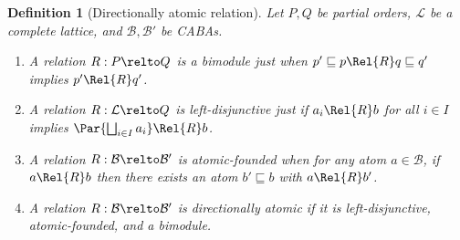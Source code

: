 \documentclass[10pt,a4paper]{article}
\newtheorem{definition}[theorem]{Definition}
\begin{document}
\begin{definition}[Directionally atomic relation]
  Let $P, Q$ be partial orders, $\mathcal{L}$ be a complete lattice, and
  $\mathcal{B}, \mathcal{B}'$ be CABAs.
  \begin{enumerate}
    \item A relation \(R : P \relto Q\) is a \emph{bimodule} just when \(p'
      \sqsubseteq p \Rel{R} q \sqsubseteq q'\) implies \(p' \Rel{R} q'\).
    \item A relation \(R : \mathcal{L} \relto Q\) is \emph{left-disjunctive}
      just if \(a_i \Rel{R} b\) for all $i \in I$ implies \(\Par{\bigsqcup_{i
      \in I} a_i} \Rel{R} b\).
    \item A relation \(R : \mathcal{B} \relto \mathcal{B}'\) is
      \emph{atomic-founded} when for any atom \(a \in \mathcal{B}\), if \(a
      \Rel{R} b\) then there exists an atom \(b' \sqsubseteq b\) with \(a
      \Rel{R} b'\).
    \item A relation \(R : \mathcal{B} \relto \mathcal{B}'\) is
      \emph{directionally atomic} if it is left-disjunctive,
      atomic-founded, and a bimodule.
  \end{enumerate}
\end{definition}
\end{document}
